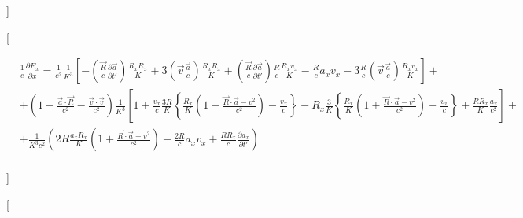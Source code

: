 \documentclass[11pt]{article}
\begin{document}
{]}

{[}

\begin{align}
  & \frac{1}{e}\frac{\partial {{E}_{x}}}{\partial x}=\frac{1}{{{c}^{2}}}\frac{1}{{{K}^{3}}}\left[ -\left( \frac{\overrightarrow{R}}{c}\frac{\partial \overrightarrow{a}}{\partial t'} \right)\frac{{{R}_{x}}{{R}_{x}}}{K}+3\left( \overrightarrow{v}\frac{\overrightarrow{a}}{c} \right)\frac{{{R}_{x}}{{R}_{x}}}{K}+\left( \frac{\overrightarrow{R}}{c}\frac{\partial \overrightarrow{a}}{\partial t'} \right)\frac{R}{c}\frac{{{R}_{x}}{{v}_{x}}}{K}-\frac{R}{c}{{a}_{x}}{{v}_{x}}-3\frac{R}{c}\left( \overrightarrow{v}\frac{\overrightarrow{a}}{c} \right)\frac{{{R}_{x}}{{v}_{x}}}{K} \right]+ \\ 
 & +\left( 1+\frac{\overrightarrow{a}\cdot \overrightarrow{R}}{{{c}^{2}}}-\frac{\overrightarrow{v}\cdot \overrightarrow{v}}{{{c}^{2}}} \right)\frac{1}{{{K}^{3}}}\left[ 1+\frac{{{v}_{x}}}{c}\frac{3R}{K}\left\{ \frac{{{R}_{x}}}{K}\left( 1+\frac{\overrightarrow{R}\cdot \overrightarrow{a}-{{v}^{2}}}{{{c}^{2}}} \right)-\frac{{{v}_{x}}}{c} \right\}-{{R}_{x}}\frac{3}{K}\left\{ \frac{{{R}_{x}}}{K}\left( 1+\frac{\overrightarrow{R}\cdot \overrightarrow{a}-{{v}^{2}}}{{{c}^{2}}} \right)-\frac{{{v}_{x}}}{c} \right\}+\frac{R{{R}_{x}}}{K}\frac{{{a}_{x}}}{{{c}^{2}}} \right]+ \\ 
 & +\frac{1}{{{K}^{3}}{{c}^{2}}}\left( 2R\frac{{{a}_{x}}{{R}_{x}}}{K}\left( 1+\frac{\overrightarrow{R}\cdot \overrightarrow{a}-{{v}^{2}}}{{{c}^{2}}} \right)-\frac{2R}{c}{{a}_{x}}{{v}_{x}}+\frac{R{{R}_{x}}}{c}\frac{\partial {{a}_{x}}}{\partial t'} \right) \\ 
\end{align}

{]}

{[}
\end{document}
